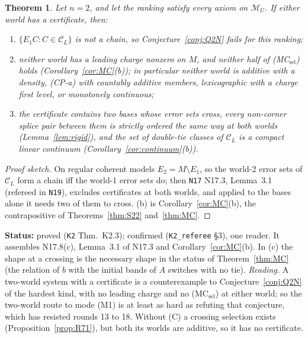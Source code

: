 \documentclass[11pt]{article}
\newtheorem{theorem}{Theorem}[section]
\theoremstyle{definition}
\theoremstyle{remark}
\newcommand{\M}{\mathcal M}
\newcommand{\C}{\mathcal C}
\newcommand{\src}[1]{\texttt{#1}}
\newcommand{\status}[1]{\par\smallskip\noindent\textbf{Status:} #1\par\smallskip}
\begin{document}
\begin{theorem}\label{thm:K23}
Let $n=2$, and let the ranking satisfy every axiom on $\M_U$. If either world has a certificate, then:
\begin{enumerate}[leftmargin=*,label=(\alph*)]
\item $\{E_1C:C\in\C_L\}$ is not a chain, so Conjecture~\ref{conj:Q2N} fails for this ranking;
\item neither world has a leading charge nonzero on $M$, and neither half of (MC$_{\mathrm{sel}}$) holds (Corollary~\ref{cor:MC}(b)); in particular neither world is additive with a density, (CP-a) with countably additive members, lexicographic with a charge first level, or monotonely continuous;
\item the certificate contains two bases whose error sets cross, every non-corner splice pair between them is strictly ordered the same way at both worlds (Lemma~\ref{lem:rigid}), and the set of double-tie classes of $\C_L$ is a compact linear continuum (Corollary~\ref{cor:continuum}(b)).
\end{enumerate}
\end{theorem}
\begin{proof}[Proof sketch]
On regular coherent models $E_2=M\setminus E_1$, so the world-2 error sets of $\C_L$ form a chain iff the world-1 error sets do; then \src{N17} N17.3, Lemma~3.1 (refereed in \src{N19}), excludes certificates at both worlds, and applied to the bases alone it needs two of them to cross. (b) is Corollary~\ref{cor:MC}(b), the contrapositive of Theorems~\ref{thm:S22} and~\ref{thm:MC}.
\end{proof}
\status{proved (\src{K2} Thm.~K2.3); confirmed (\src{K2\_referee} \S3), one reader. It assembles N17.8(c), Lemma~3.1 of N17.3 and Corollary~\ref{cor:MC}(b). In (c) the shape at a crossing is the necessary shape in the status of Theorem~\ref{thm:MC} (the relation of $b$ with the initial bands of $A$ switches with no tie). \emph{Reading.} A two-world system with a certificate is a counterexample to Conjecture~\ref{conj:Q2N} of the hardest kind, with no leading charge and no (MC$_{\mathrm{sel}}$) at either world; so the two-world route to mode (M1) is at least as hard as refuting that conjecture, which has resisted rounds 13 to 18. Without (C) a crossing selection exists (Proposition~\ref{prop:R71}), but both its worlds are additive, so it has no certificate.}
\end{document}
